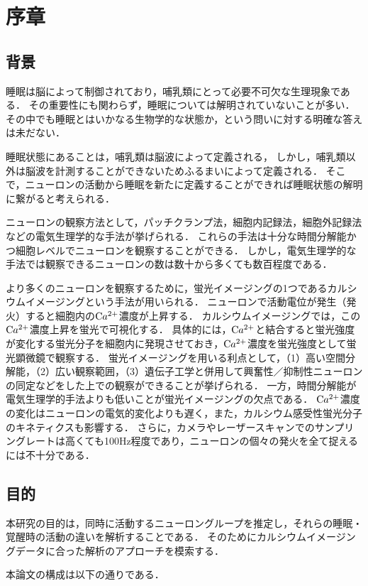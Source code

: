 \chapter{序章}
\section{背景}
睡眠は脳によって制御されており\cite{Hobson2005}，哺乳類にとって必要不可欠な生理現象である．
その重要性にも関わらず，睡眠については解明されていないことが多い．
その中でも睡眠とはいかなる生物学的な状態か，という問いに対する明確な答えは未だない\cite{Kanda2016}．

睡眠状態にあることは，哺乳類は脳波によって定義される，
しかし，哺乳類以外は脳波を計測することができないためふるまいによって定義される．
そこで，ニューロンの活動から睡眠を新たに定義することができれば睡眠状態の解明に繋がると考えられる\cite{Kanda2020}．

ニューロンの観察方法として，パッチクランプ法，細胞内記録法，細胞外記録法などの電気生理学的な手法が挙げられる．
これらの手法は十分な時間分解能かつ細胞レベルでニューロンを観察することができる．
しかし，電気生理学的な手法では観察できるニューロンの数は数十から多くても数百程度である．

より多くのニューロンを観察するために，蛍光イメージングの1つであるカルシウムイメージングという手法が用いられる．
ニューロンで活動電位が発生（発火）すると細胞内の$\text Ca^{2+}$濃度が上昇する．
カルシウムイメージングでは，この$\text Ca^{2+}$濃度上昇を蛍光で可視化する．
具体的には，$\text Ca^{2+}$と結合すると蛍光強度が変化する蛍光分子を細胞内に発現させておき，$\text Ca^{2+}$濃度を蛍光強度として蛍光顕微鏡で観察する．
蛍光イメージングを用いる利点として，（1）高い空間分解能，（2）広い観察範囲，（3）遺伝子工学と併用して興奮性／抑制性ニューロンの同定などをした上での観察ができることが挙げられる．
一方，時間分解能が電気生理学的手法よりも低いことが蛍光イメージングの欠点である．
$\text Ca^{2+}$濃度の変化はニューロンの電気的変化よりも遅く，また，カルシウム感受性蛍光分子のキネティクスも影響する．
さらに，カメラやレーザースキャンでのサンプリングレートは高くても100Hz程度であり，ニューロンの個々の発火を全て捉えるには不十分である．

\section{目的}
本研究の目的は，同時に活動するニューロングループを推定し，それらの睡眠・覚醒時の活動の違いを解析することである．
そのためにカルシウムイメージングデータに合った解析のアプローチを模索する．

本論文の構成は以下の通りである．

